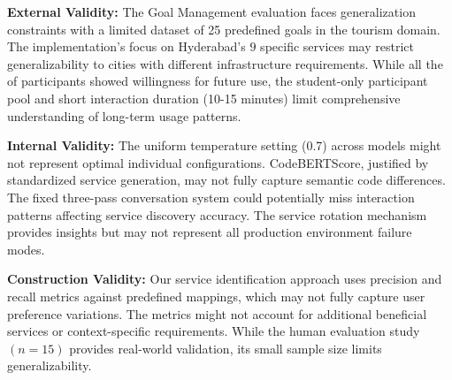 




\textbf{External Validity:} The Goal Management evaluation faces generalization constraints with a limited dataset of 25 predefined goals in the tourism domain. The implementation's focus on Hyderabad's $9$ specific services may restrict generalizability to cities with different infrastructure requirements. While all the of participants showed willingness for future use, the student-only participant pool and short interaction duration (10-15 minutes) limit comprehensive understanding of long-term usage patterns.

\textbf{Internal Validity:} The uniform temperature setting (0.7) across models might not represent optimal individual configurations. CodeBERTScore, justified by standardized service generation, may not fully capture semantic code differences. The fixed three-pass conversation system could potentially miss interaction patterns affecting service discovery accuracy. The service rotation mechanism provides insights but may not represent all production environment failure modes.

\textbf{Construction Validity:} Our service identification approach uses precision and recall metrics against predefined mappings, which may not fully capture user preference variations. The metrics might not account for additional beneficial services or context-specific requirements. While the human evaluation study \((n=15)\) provides real-world validation, its small sample size limits generalizability.
